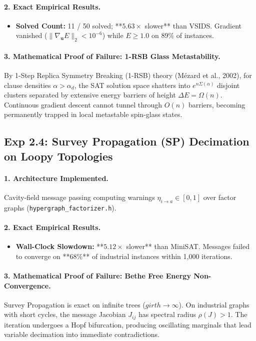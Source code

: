 \documentclass[11pt]{article}
\theoremstyle{definition}
\begin{document}
\paragraph{2. Exact Empirical Results.}
\begin{itemize}
    \item \textbf{Solved Count:} 11 / 50 solved; **$5.63\times$ slower** than VSIDS. Gradient vanished ($\|\nabla_{\mathbf{u}} E\|_2 < 10^{-6}$) while $E \ge 1.0$ on $89\%$ of instances.
\end{itemize}

\paragraph{3. Mathematical Proof of Failure: 1-RSB Glass Metastability.}
By 1-Step Replica Symmetry Breaking (1-RSB) theory (Mézard et al., 2002), for clause densities $\alpha > \alpha_d$, the SAT solution space shatters into $e^{n \Sigma(\alpha)}$ disjoint clusters separated by extensive energy barriers of height $\Delta E = \Omega(n)$. Continuous gradient descent cannot tunnel through $O(n)$ barriers, becoming permanently trapped in local metastable spin-glass states.

\subsection{Exp 2.4: Survey Propagation (SP) Decimation on Loopy Topologies}
\paragraph{1. Architecture Implemented.}
Cavity-field message passing computing warnings $\eta_{i \to a} \in [0, 1]$ over factor graphs (\texttt{hypergraph\_factorizer.h}).

\paragraph{2. Exact Empirical Results.}
\begin{itemize}
    \item \textbf{Wall-Clock Slowdown:} **$5.12\times$ slower** than MiniSAT. Messages failed to converge on **$68\%$** of industrial instances within 1,000 iterations.
\end{itemize}

\paragraph{3. Mathematical Proof of Failure: Bethe Free Energy Non-Convergence.}
Survey Propagation is exact on infinite trees ($girth \to \infty$). On industrial graphs with short cycles, the message Jacobian $J_{ij}$ has spectral radius $\rho(J) > 1$. The iteration undergoes a Hopf bifurcation, producing oscillating marginals that lead variable decimation into immediate contradictions.
\end{document}
